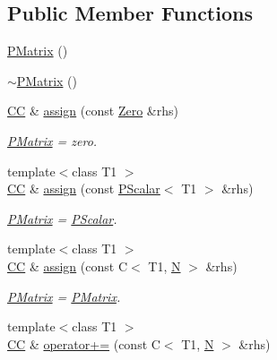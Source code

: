 \subsection*{Public Member Functions}
\begin{DoxyCompactItemize}
\item 
\mbox{\hyperlink{classENSEM_1_1PMatrix_ae32acebccb43c577a9e4dde0866a6c78}{P\+Matrix}} ()
\item 
\mbox{\hyperlink{classENSEM_1_1PMatrix_a3196ba50adba3cc1e72bb29ce0b02cda}{$\sim$\+P\+Matrix}} ()
\item 
\mbox{\hyperlink{classENSEM_1_1PMatrix_a744bac549029029effe32dc1705660ec}{CC}} \& \mbox{\hyperlink{classENSEM_1_1PMatrix_a4d8aeb469d2295dc8c555a0180ab0613}{assign}} (const \mbox{\hyperlink{structENSEM_1_1Zero}{Zero}} \&rhs)
\begin{DoxyCompactList}\small\item\em \mbox{\hyperlink{classENSEM_1_1PMatrix}{P\+Matrix}} = zero. \end{DoxyCompactList}\item 
{\footnotesize template$<$class T1 $>$ }\\\mbox{\hyperlink{classENSEM_1_1PMatrix_a744bac549029029effe32dc1705660ec}{CC}} \& \mbox{\hyperlink{classENSEM_1_1PMatrix_aa9ba4e8c3935c0591c0b63daef8edaa5}{assign}} (const \mbox{\hyperlink{classENSEM_1_1PScalar}{P\+Scalar}}$<$ T1 $>$ \&rhs)
\begin{DoxyCompactList}\small\item\em \mbox{\hyperlink{classENSEM_1_1PMatrix}{P\+Matrix}} = \mbox{\hyperlink{classENSEM_1_1PScalar}{P\+Scalar}}. \end{DoxyCompactList}\item 
{\footnotesize template$<$class T1 $>$ }\\\mbox{\hyperlink{classENSEM_1_1PMatrix_a744bac549029029effe32dc1705660ec}{CC}} \& \mbox{\hyperlink{classENSEM_1_1PMatrix_ac3c0e489c8c8011edc4ea93477176b84}{assign}} (const C$<$ T1, \mbox{\hyperlink{adat__devel_2lib_2hadron_2operator__name__util_8cc_a7722c8ecbb62d99aee7ce68b1752f337}{N}} $>$ \&rhs)
\begin{DoxyCompactList}\small\item\em \mbox{\hyperlink{classENSEM_1_1PMatrix}{P\+Matrix}} = \mbox{\hyperlink{classENSEM_1_1PMatrix}{P\+Matrix}}. \end{DoxyCompactList}\item 
{\footnotesize template$<$class T1 $>$ }\\\mbox{\hyperlink{classENSEM_1_1PMatrix_a744bac549029029effe32dc1705660ec}{CC}} \& \mbox{\hyperlink{classENSEM_1_1PMatrix_af6bd651888f2621169845b757b2200ee}{operator+=}} (const C$<$ T1, \mbox{\hyperlink{adat__devel_2lib_2hadron_2operator__name__util_8cc_a7722c8ecbb62d99aee7ce68b1752f337}{N}} $>$ \&rhs)

\end{DoxyCompactItemize}

